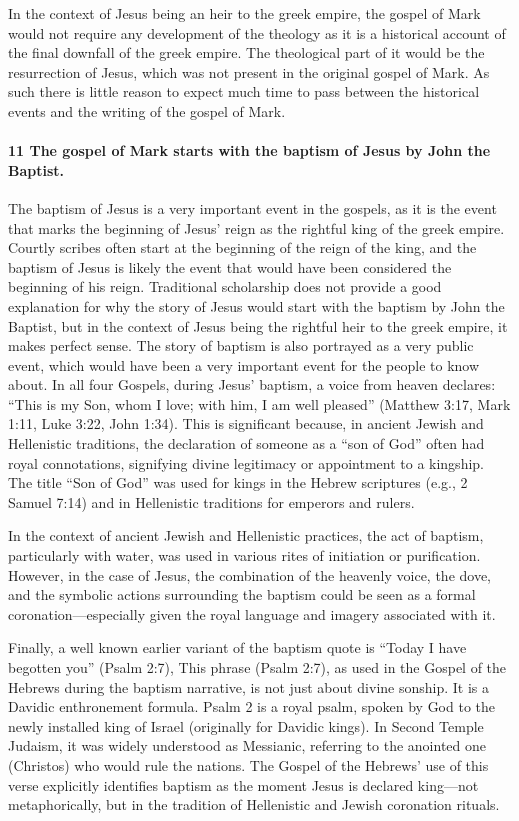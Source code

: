 In the context of Jesus being an heir to the greek empire, the gospel of Mark would not require any development of the theology as it is a historical account of the final downfall of the greek empire.
The theological part of it would be the resurrection of Jesus, which was not present in the original gospel of Mark.
As such there is little reason to expect much time to pass between the historical events and the writing of the gospel of Mark.

\paragraph{11 The gospel of Mark starts with the baptism of Jesus by John the Baptist.}\label{par:the-gospel-of-mark-starts-with-the-baptism-of-jesus-by-john-the-baptist.}

The baptism of Jesus is a very important event in the gospels, as it is the event that marks the beginning of Jesus' reign as the rightful king of the greek empire.
Courtly scribes often start at the beginning of the reign of the king, and the baptism of Jesus is likely the event that would have been considered the beginning of his reign.
Traditional scholarship does not provide a good explanation for why the story of Jesus would start with the baptism by John the Baptist, but in the context of Jesus being the rightful heir to the greek empire, it makes perfect sense.
The story of baptism is also portrayed as a very public event, which would have been a very important event for the people to know about.
In all four Gospels, during Jesus' baptism, a voice from heaven declares: ``This is my Son, whom I love; with him, I am well pleased'' (Matthew 3:17, Mark 1:11, Luke 3:22, John 1:34).
This is significant because, in ancient Jewish and Hellenistic traditions, the declaration of someone as a ``son of God'' often had royal connotations, signifying divine legitimacy or appointment to a kingship.
The title ``Son of God'' was used for kings in the Hebrew scriptures (e.g., 2 Samuel 7:14) and in Hellenistic traditions for emperors and rulers.

In the context of ancient Jewish and Hellenistic practices, the act of baptism, particularly with water, was used in various rites of initiation or purification.
However, in the case of Jesus, the combination of the heavenly voice, the dove, and the symbolic actions surrounding the baptism could be seen as a formal coronation---especially given the royal language and imagery associated with it.

Finally, a well known earlier variant of the baptism quote is ``Today I have begotten you'' (Psalm 2:7), This phrase (Psalm 2:7), as used in the Gospel of the Hebrews during the baptism narrative, is not just about divine sonship.
It is a Davidic enthronement formula.
Psalm 2 is a royal psalm, spoken by God to the newly installed king of Israel (originally for Davidic kings).
In Second Temple Judaism, it was widely understood as Messianic, referring to the anointed one (Christos) who would rule the nations.
The Gospel of the Hebrews' use of this verse explicitly identifies baptism as the moment Jesus is declared king---not metaphorically, but in the tradition of Hellenistic and Jewish coronation rituals.

